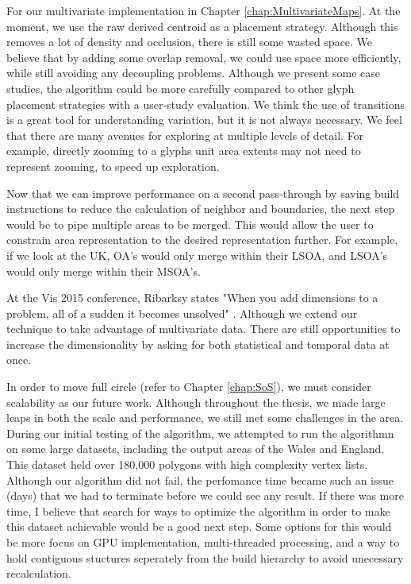 For our multivariate implementation in Chapter \ref{chap:MultivariateMaps}. At the moment, we use the raw derived centroid as a placement strategy. Although this removes a lot of density and occlusion, there is still some wasted space. We believe that by adding some overlap removal, we could use space more efficiently, while still avoiding any decoupling problems. Although we present some case studies, the algorithm could be more carefully compared to other glyph placement strategies with a user-study evaluation. We think the use of transitions is a great tool for understanding variation, but it is not always necessary. We feel that there are many avenues for exploring at multiple levels of detail. For example, directly zooming to a glyphs unit area extents may not need to represent zooming, to speed up exploration.

Now that we can improve performance on a second pass-through by saving build instructions to reduce the calculation of neighbor and boundaries, the next step would be to pipe multiple areas to be merged. This would allow the user to constrain area representation to the desired representation further. For example, if we look at the UK, OA's would only merge within their LSOA, and LSOA's would only merge within their MSOA's.

At the Vis 2015 conference, Ribarksy states "When you add dimensions to a problem, all of a sudden it becomes unsolved" \cite{ribarsky2015solved}. Although we extend our technique to take advantage of multivariate data. There are still opportunities to increase the dimensionality by asking for both statistical and temporal data at once.

In order to move full circle (refer to Chapter \ref{chap:SoS}), we must consider scalability as our future work. Although throughout the thesis, we made large leaps in both the scale and performance, we still met some challenges in the area. During our initial testing of the algorithm, we attempted to run the algorithmn on some large datasets, including the output areas of the Wales and England. This dataset held over 180,000 polygons with high complexity vertex lists. Although our algorithm did not fail, the perfomance time became such an issue (days) that we had to terminate before we could see any result. If there was more time, I believe that search for ways to optimize the algorithm in order to make this dataset achievable would be a good next step. Some options for this would be more focus on GPU implementation, multi-threaded processing, and a way to hold contiguous stuctures seperately from the build hierarchy to avoid unecessary recalculation.

